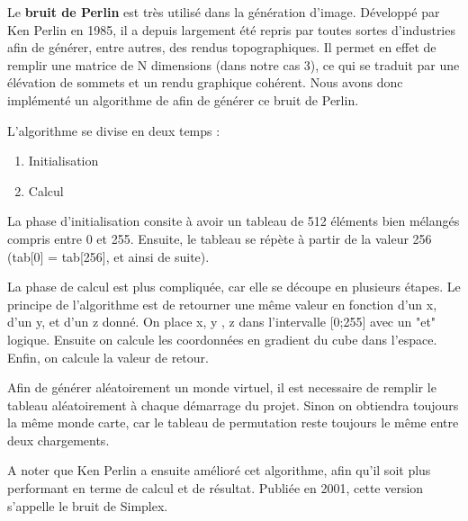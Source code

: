 ﻿Le \textbf{bruit de Perlin} est très utilisé dans la génération d'image. Développé par Ken Perlin en 1985, il a depuis largement été repris par toutes sortes d'industries afin de générer, entre autres, des rendus topographiques.	Il permet en effet de remplir une matrice de N dimensions (dans notre cas 3), ce qui se traduit par une élévation de sommets et un rendu graphique cohérent. Nous avons donc implémenté un algorithme de afin de générer ce bruit de Perlin. 

L'algorithme se divise en deux temps :

\begin{enumerate}
	\item Initialisation
	\item Calcul
\end{enumerate}

La phase d'initialisation consite à avoir un tableau de 512 éléments bien mélangés compris entre 0 et 255. Ensuite, le tableau se répète à partir de la valeur 256 (tab[0] = tab[256], et ainsi de suite). 

La phase de calcul est plus compliquée, car elle se découpe en plusieurs étapes. Le principe de l'algorithme est de retourner une même valeur en fonction d'un x, d'un y, et d'un z donné. On place x, y , z dans l'intervalle [0;255] avec un "et" logique. Ensuite on calcule les coordonnées en gradient du cube dans l'espace. Enfin, on calcule la valeur de retour. 

Afin de générer aléatoirement un monde virtuel, il est necessaire de remplir le tableau aléatoirement à chaque démarrage du projet. Sinon on obtiendra toujours la même monde carte, car le tableau de permutation reste toujours le même entre deux chargements.

A noter que Ken Perlin a ensuite amélioré cet algorithme, afin qu'il soit plus performant en terme de calcul et de résultat. Publiée en 2001, cette version s'appelle le bruit de Simplex.
